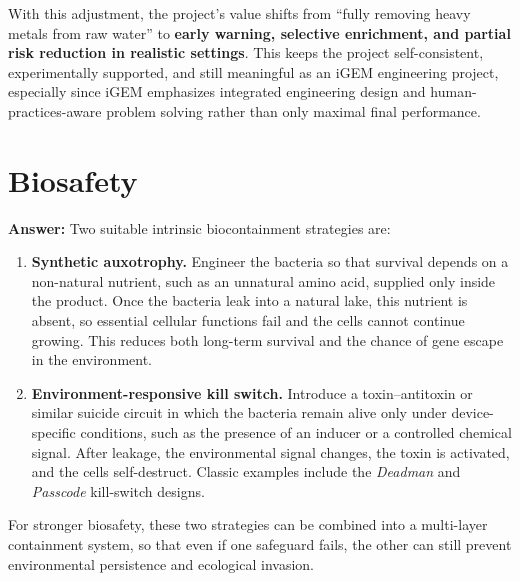 \documentclass[12pt,a4paper]{article}
\begin{document}
With this adjustment, the project’s value shifts from ``fully removing heavy metals from raw water'' to \textbf{early warning, selective enrichment, and partial risk reduction in realistic settings}. This keeps the project self-consistent, experimentally supported, and still meaningful as an iGEM engineering project, especially since iGEM emphasizes integrated engineering design and human-practices-aware problem solving rather than only maximal final performance.

\section{Biosafety}
\noindent\textbf{Answer:} Two suitable intrinsic biocontainment strategies are:

\begin{enumerate}
    \item \textbf{Synthetic auxotrophy.}  
    Engineer the bacteria so that survival depends on a non-natural nutrient, such as an unnatural amino acid, supplied only inside the product. Once the bacteria leak into a natural lake, this nutrient is absent, so essential cellular functions fail and the cells cannot continue growing. This reduces both long-term survival and the chance of gene escape in the environment.  

    \item \textbf{Environment-responsive kill switch.}  
    Introduce a toxin--antitoxin or similar suicide circuit in which the bacteria remain alive only under device-specific conditions, such as the presence of an inducer or a controlled chemical signal. After leakage, the environmental signal changes, the toxin is activated, and the cells self-destruct. Classic examples include the \emph{Deadman} and \emph{Passcode} kill-switch designs.
\end{enumerate}

For stronger biosafety, these two strategies can be combined into a multi-layer containment system, so that even if one safeguard fails, the other can still prevent environmental persistence and ecological invasion.
\end{document}
